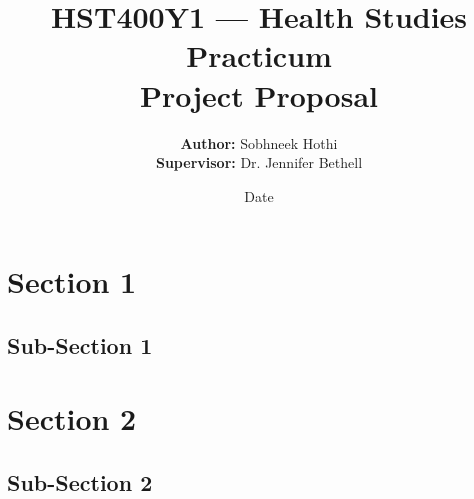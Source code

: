 \documentclass[letterpaper,12pt]{article}
\begin{document}
\title{HST400Y1 — Health Studies Practicum \\\textbf{Project Proposal}}
\author{\textbf{Author:} Sobhneek Hothi \\
\textbf{Supervisor:} Dr. Jennifer Bethell}
\date{Date}
\maketitle
\tableofcontents
\newpage

\section{Section 1}

\subsection{Sub-Section 1}

\section{Section 2}

\subsection{Sub-Section 2}
\end{document}
